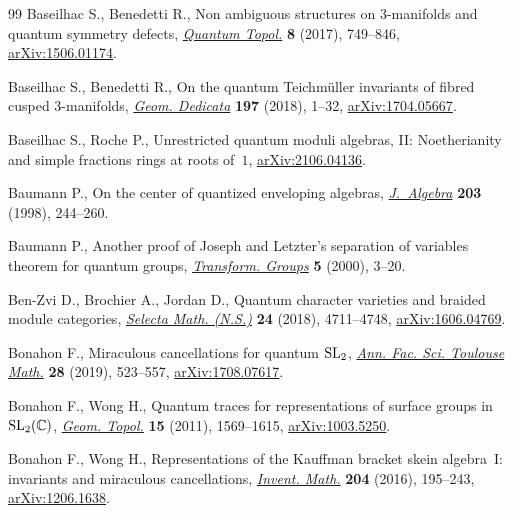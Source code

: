 \documentclass[pdftex]{sigma}%
\numberwithin{equation}{section}
\numberwithin{figure}{section}
\begin{document}
\begin{thebibliography}{99}
Baseilhac S., Benedetti R., Non ambiguous structures on 3-manifolds and quantum
 symmetry defects, \href{https://doi.org/10.4171/QT/101}{\textit{Quantum Topol.}} \textbf{8} (2017), 749--846,
 \href{https://arxiv.org/abs/1506.01174}{arXiv:1506.01174}.

Baseilhac S., Benedetti R., On the quantum {T}eichm\"uller invariants of fibred
 cusped 3-manifolds, \href{https://doi.org/10.1007/s10711-017-0315-0}{\textit{Geom. Dedicata}} \textbf{197} (2018), 1--32,
 \href{https://arxiv.org/abs/1704.05667}{arXiv:1704.05667}.

Baseilhac S., Roche P., Unrestricted quantum moduli algebras, II: Noetherianity
 and simple fractions rings at roots of~$1$, \href{https://arxiv.org/abs/2106.04136}{arXiv:2106.04136}.

Baumann P., On the center of quantized enveloping algebras, \href{https://doi.org/10.1006/jabr.1997.7313}{\textit{J.~Algebra}}
 \textbf{203} (1998), 244--260.

Baumann P., Another proof of {J}oseph and {L}etzter's separation of variables
 theorem for quantum groups, \href{https://doi.org/10.1007/BF01237175}{\textit{Transform. Groups}} \textbf{5} (2000),
 3--20.

Ben-Zvi D., Brochier A., Jordan D., Quantum character varieties and braided
 module categories, \href{https://doi.org/10.1007/s00029-018-0426-y}{\textit{Selecta Math. (N.S.)}} \textbf{24} (2018),
 4711--4748, \href{https://arxiv.org/abs/1606.04769}{arXiv:1606.04769}.

Bonahon F., Miraculous cancellations for quantum {${\rm SL}_2$}, \href{https://doi.org/10.5802/afst.1608}{\textit{Ann.
 Fac. Sci. Toulouse Math.}} \textbf{28} (2019), 523--557, \href{https://arxiv.org/abs/1708.07617}{arXiv:1708.07617}.

Bonahon F., Wong H., Quantum traces for representations of surface groups in
 {${\rm SL}_2(\mathbb C)$}, \href{https://doi.org/10.2140/gt.2011.15.1569}{\textit{Geom. Topol.}} \textbf{15} (2011),
 1569--1615, \href{https://arxiv.org/abs/1003.5250}{arXiv:1003.5250}.

Bonahon F., Wong H., Representations of the {K}auffman bracket skein
 algebra~{I}: invariants and miraculous cancellations, \href{https://doi.org/10.1007/s00222-015-0611-y}{\textit{Invent. Math.}}
 \textbf{204} (2016), 195--243, \href{https://arxiv.org/abs/1206.1638}{arXiv:1206.1638}.


\end{thebibliography}
\end{document}
